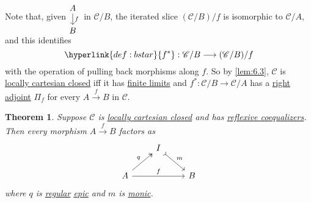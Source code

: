 \documentclass{article}
\newenvironment{tikzcdi}{\begin{tikzcd}[cramped, sep=scriptsize]}{\end{tikzcd}}
\let\to\longrightarrow
\newtheorem{nthm}{Theorem}[section]
\begin{document}
Note that, given $\begin{tikzcdi}A \dar{f} \\ B\end{tikzcdi}$ in $\mathscr{C}/B$, the iterated slice $(\mathscr{C}/B)/f$ is isomorphic to $\mathscr{C}/A$, and this identifies
\begin{equation*}\hyperlink{def:bstar}{f^*}: \mathscr{C}/B \to (\mathscr{C}/B)/f\end{equation*}
with the operation of pulling back morphisms along $f$.
So by \cref{lem:6.3}, $\mathscr{C}$ is \hyperlink{def:lcc}{locally cartesian closed} iff it has \hyperlink{def:limit}{finite limits} and $f^*: \mathscr{C}/B \to \mathscr{C}/A$ has a \hyperlink{def:adj}{right adjoint} $\Pi_f$ for every $A \overset{f}\to B$ in $\mathscr{C}$.

\begin{nthm}\label{thm:6.7}
  Suppose $\mathscr{C}$ is \hyperlink{def:lcc}{locally cartesian closed} and has \hyperlink{def:reflexive}{reflexive coequalizers}.
  Then every morphism $A \overset{f}\to B$ factors as
  \begin{equation*}
    \begin{tikzcd}
      & I\arrow[rd, tail, "m"] \\
      A \arrow[ur, two heads, "q"] \arrow[rr, "f"] & & B
    \end{tikzcd}
  \end{equation*}
  where $q$ is \hyperlink{def:regular}{regular} \hyperlink{def:epic}{epic} and $m$ is \hyperlink{def:monic}{monic}.
\end{nthm}
\end{document}
